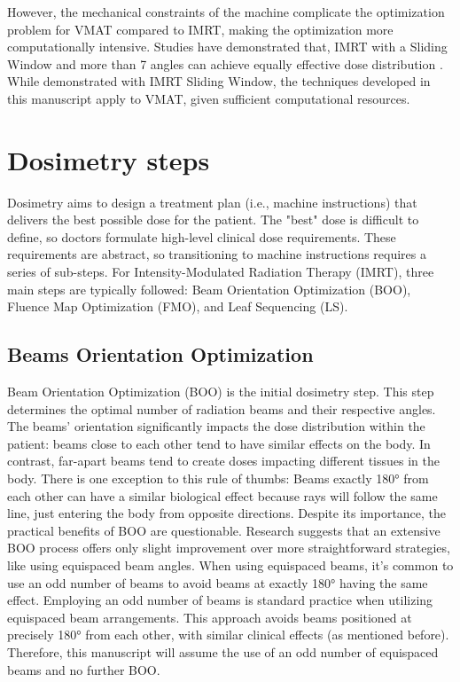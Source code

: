 However, the mechanical constraints of the machine complicate the optimization problem for VMAT compared to IMRT, making the optimization more computationally intensive.
Studies have demonstrated that, IMRT with a Sliding Window and more than 7 angles can achieve equally effective dose distribution \cite{Bortfeld2010} \cite{Quan2012}.
While demonstrated with IMRT Sliding Window, the techniques developed in this manuscript apply to VMAT, given sufficient computational resources.






\section{Dosimetry steps}
Dosimetry aims to design a treatment plan (i.e., machine instructions) that delivers the best possible dose for the patient.
The "best" dose is difficult to define, so doctors formulate high-level clinical dose requirements.
These requirements are abstract, so transitioning to machine instructions requires a series of sub-steps.
For Intensity-Modulated Radiation Therapy (IMRT), three main steps are typically followed: Beam Orientation Optimization (BOO), Fluence Map Optimization (FMO), and Leaf Sequencing (LS).
\subsection[BOO]{Beams Orientation Optimization}
Beam Orientation Optimization (BOO) is the initial dosimetry step.
This step determines the optimal number of radiation beams and their respective angles.
The beams' orientation significantly impacts the dose distribution within the patient: beams close to each other tend to have similar effects on the body.
In contrast, far-apart beams tend to create doses impacting different tissues in the body.
There is one exception to this rule of thumbs: Beams exactly 180° from each other can have a similar biological effect because rays will follow the same line, just entering the body from opposite directions.
Despite its importance, the practical benefits of BOO are questionable.
Research \cite{Rocha2019} suggests that an extensive BOO process offers only slight improvement over more straightforward strategies, like using equispaced beam angles.
When using equispaced beams, it's common to use an odd number of beams to avoid beams at exactly 180° having the same effect.
Employing an odd number of beams is standard practice when utilizing equispaced beam arrangements.
This approach avoids beams positioned at precisely 180° from each other, with similar clinical effects (as mentioned before).
Therefore, this manuscript will assume the use of an odd number of equispaced beams and no further BOO.

